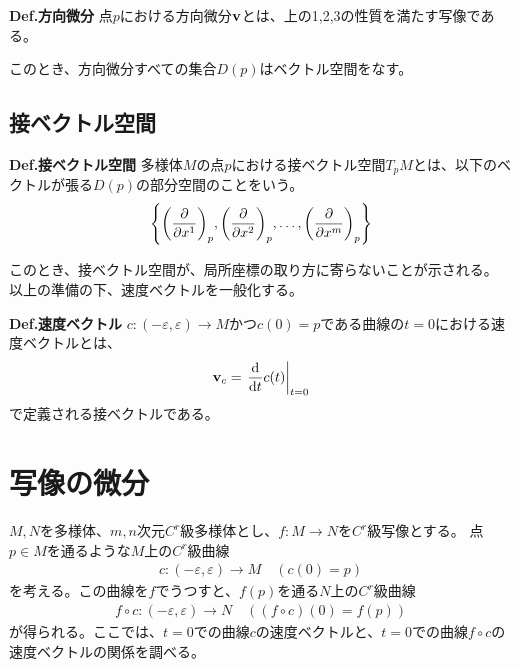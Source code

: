 \documentclass[a4paper,11pt]{jsarticle}
\numberwithin{equation}{section}
\begin{document}
\begin{itembox}[l]{\textbf{Def.方向微分}}
  点$p$における方向微分$\vb{v}$とは、上の1,2,3の性質を満たす写像である。
\end{itembox}
このとき、方向微分すべての集合$D(p)$はベクトル空間をなす。

\subsection{接ベクトル空間}
\begin{itembox}[l]{\textbf{Def.接ベクトル空間}}
  多様体$M$の点$p$における接ベクトル空間$T_pMとは、$以下のベクトルが張る$D(p)$の部分空間のことをいう。
  \begin{align}
    \qty{\qty(\pdv{x^1})_p, \qty(\pdv{x^2})_p, \ldots, \qty(\pdv{x^m})_p}
  \end{align}  
\end{itembox}
このとき、接ベクトル空間が、局所座標の取り方に寄らないことが示される。\\

以上の準備の下、速度ベクトルを一般化する。
\begin{itembox}[l]{\textbf{Def.速度ベクトル}}
  $c: (-\varepsilon, \varepsilon) \to M$かつ$c(0) = p$である曲線の$t=0$における速度ベクトルとは、
  \begin{align}
    \vb{v}_c = \left.\dv{t} c(t)\right|_{t=0} 
  \end{align}
  で定義される接ベクトルである。
\end{itembox}



\section{写像の微分}
$M,N$を多様体、$m,n$次元$C^r$級多様体とし、$f: M \to N$を$C^r$級写像とする。
点$p \in M$を通るような$M$上の$C^r$級曲線
\begin{align}
    c: (-\varepsilon, \varepsilon) \to M \quad (c(0) = p)
\end{align}
を考える。この曲線を$f$でうつすと、$f(p)$を通る$N$上の$C^r$級曲線
\begin{align}
    f \circ c: (-\varepsilon, \varepsilon) \to N \quad ((f \circ c)(0) = f(p))
\end{align}
が得られる。ここでは、$t=0$での曲線$c$の速度ベクトルと、$t=0$での曲線$f \circ c$の速度ベクトルの関係を調べる。
\end{document}
